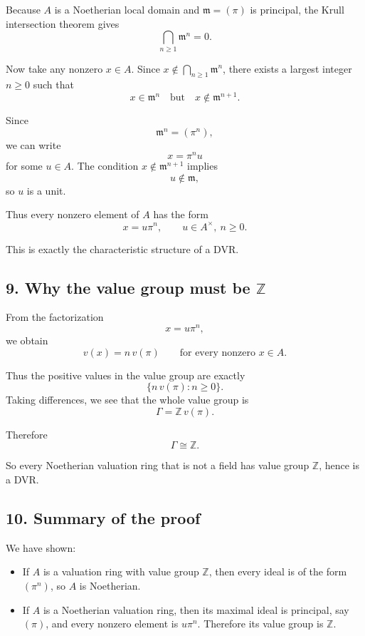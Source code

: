 \documentclass[12pt,a4paper]{article}
\theoremstyle{notespace}
\begin{document}
Because \(A\) is a Noetherian local domain and \(\mathfrak m=(\pi)\) is principal, the Krull intersection theorem gives
\[
\bigcap_{n\ge 1} \mathfrak m^n = 0.
\]

Now take any nonzero \(x\in A\). Since \(x\notin \bigcap_{n\ge 1}\mathfrak m^n\), there exists a largest integer \(n\ge 0\) such that
\[
x\in \mathfrak m^n
\quad \text{but} \quad
x\notin \mathfrak m^{n+1}.
\]

Since
\[
\mathfrak m^n=(\pi^n),
\]
we can write
\[
x=\pi^n u
\]
for some \(u\in A\). The condition \(x\notin \mathfrak m^{n+1}\) implies
\[
u\notin \mathfrak m,
\]
so \(u\) is a unit.

Thus every nonzero element of \(A\) has the form
\[
x=u\pi^n,
\qquad
u\in A^\times,\ n\ge 0.
\]

This is exactly the characteristic structure of a DVR.

\subsection{9. Why the value group must be \(\mathbb Z\)}

From the factorization
\[
x=u\pi^n,
\]
we obtain
\[
v(x)=n\,v(\pi)
\qquad
\text{for every nonzero }x\in A.
\]

Thus the positive values in the value group are exactly
\[
\{n\,v(\pi): n\ge 0\}.
\]
Taking differences, we see that the whole value group is
\[
\Gamma = \mathbb Z\,v(\pi).
\]

Therefore
\[
\Gamma \cong \mathbb Z.
\]

So every Noetherian valuation ring that is not a field has value group \(\mathbb Z\), hence is a DVR.

\subsection{10. Summary of the proof}

We have shown:

\begin{itemize}
	\item If \(A\) is a valuation ring with value group \(\mathbb Z\), then every ideal is of the form \((\pi^n)\), so \(A\) is Noetherian.
	\item If \(A\) is a Noetherian valuation ring, then its maximal ideal is principal, say \((\pi)\), and every nonzero element is \(u\pi^n\). Therefore its value group is \(\mathbb Z\).
\end{itemize}
\end{document}
